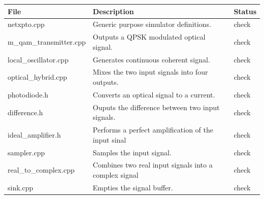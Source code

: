 \begin{table}[H]
\centering
\begin{tabulary}{1.0\textwidth}{|L|L|l|}
\hline
\textbf{File}                   & \textbf{Description}									& {\bf Status}\\
\hline
netxpto.cpp                     & Generic purpose simulator definitions.				& check\\
\hline
m\_qam\_transmitter.cpp         & Outputs a QPSK modulated optical signal.				& check\\
\hline
local\_oscillator.cpp           & Generates continuous coherent signal.					& check\\
\hline
optical\_hybrid.cpp             & Mixes the two input signals into four outputs.		& check\\
\hline
photodiode.h                    & Converts an optical signal to a current.				& check\\
\hline
difference.h                    & Ouputs the difference between two input signals.		& check\\
\hline
ideal\_amplifier.h				& Performs a perfect amplification of the input sinal	& check\\
\hline
sampler.cpp                     & Samples the input signal.								& check\\
\hline
real\_to\_complex.cpp			& Combines two real input signals into a complex signal	& check\\
\hline
sink.cpp                        & Empties the signal buffer.							& check\\
\hline
\end{tabulary}
\end{table}






